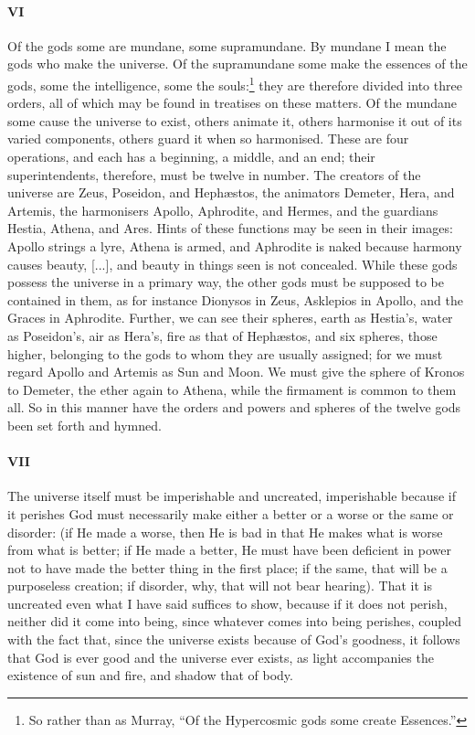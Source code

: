 \documentclass[12pt]{article}
\begin{document}
\paragraph{VI} Of the gods some are mundane, some supramundane. By mundane I
mean the gods who make the universe. Of the supramundane some make the essences
of the gods, some the intelligence, some the souls:\footnote{So rather than as
Murray, ``Of the Hypercosmic gods some create Essences.''} they are therefore
divided into three orders, all of which may be found in treatises on these
matters. Of the mundane some cause the universe to exist, others animate it,
others harmonise it out of its varied components, others guard it when so
harmonised.  These are four operations, and each has a beginning, a middle, and
an end; their superintendents, therefore, must be twelve in number. The
creators of the universe are Zeus, Poseidon, and Heph{\ae}stos, the animators
Demeter, Hera, and Artemis, the harmonisers Apollo, Aphrodite, and Hermes, and
the guardians Hestia, Athena, and Ares. Hints of these functions may be seen in
their images: Apollo strings a lyre, Athena is armed, and Aphrodite is naked
because harmony causes beauty, [...], and beauty in things seen is not
concealed. While these gods possess the universe in a primary way, the other
gods must be supposed to be contained in them, as for instance Dionysos in
Zeus, Asklepios in Apollo, and the Graces in Aphrodite. Further, we can see
their spheres, earth as Hestia's, water as Poseidon's, air as Hera's, fire as
that of Heph{\ae}stos, and six spheres, those higher, belonging to the gods to
whom they are usually assigned; for we must regard Apollo and Artemis as Sun
and Moon. We must give the sphere of Kronos to Demeter, the ether again to
Athena, while the firmament is common to them all. So in this manner have the
orders and powers and spheres of the twelve gods been set forth and hymned.

\paragraph{VII} The universe itself must be imperishable and uncreated,
imperishable because if it perishes God must necessarily make either a better
or a worse or the same or disorder: (if He made a worse, then He is bad in that
He makes what is worse from what is better; if He made a better, He must have
been deficient in power not to have made the better thing in the first place;
if the same, that will be a purposeless creation; if disorder, why, that will
not bear hearing). That it is uncreated even what I have said suffices to show,
because if it does not perish, neither did it come into being, since whatever
comes into being perishes, coupled with the fact that, since the universe
exists because of God's goodness, it follows that God is ever good and the
universe ever exists, as light accompanies the existence of sun and fire, and
shadow that of body.
\end{document}

